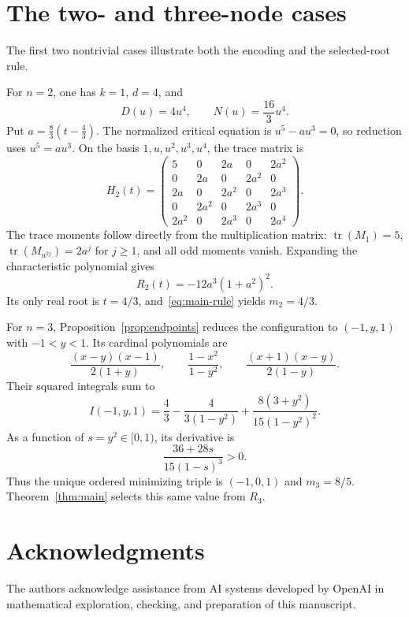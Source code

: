 \documentclass[11pt,leqno]{amsart}
\theoremstyle{definition}
\theoremstyle{remark}
\numberwithin{equation}{section}
\newcommand{\tr}{\operatorname{tr}}
\begin{document}
\section{The two- and three-node cases}\label{sec:examples}

The first two nontrivial cases illustrate both the encoding and the
selected-root rule.

For $n=2$, one has $k=1$, $d=4$, and
\[
 D(u)=4u^4,\qquad N(u)=\frac{16}{3}u^4.
\]
Put $a=\frac83(t-\frac43)$. The normalized critical equation is
$u^5-au^3=0$, so reduction uses $u^5=au^3$. On the basis
$1,u,u^2,u^3,u^4$, the trace matrix is
\begin{equation}\label{eq:two-node-H}
 H_2(t)=
 \begin{pmatrix}
 5&0&2a&0&2a^2\\
 0&2a&0&2a^2&0\\
 2a&0&2a^2&0&2a^3\\
 0&2a^2&0&2a^3&0\\
 2a^2&0&2a^3&0&2a^4
 \end{pmatrix}.
\end{equation}
The trace moments follow directly from the multiplication matrix:
$\tr(M_1)=5$, $\tr(M_{u^{2j}})=2a^j$ for $j\geq1$, and all odd
moments vanish. Expanding the characteristic polynomial gives
\[
 R_2(t)=-12a^3(1+a^2)^2.
\]
Its only real root is $t=4/3$, and~\eqref{eq:main-rule} yields
$m_2=4/3$.

For $n=3$, Proposition~\ref{prop:endpoints} reduces the configuration
to $(-1,y,1)$ with $-1<y<1$. Its cardinal polynomials are
\[
 \frac{(x-y)(x-1)}{2(1+y)},\qquad
 \frac{1-x^2}{1-y^2},\qquad
 \frac{(x+1)(x-y)}{2(1-y)}.
\]
Their squared integrals sum to
\begin{equation}\label{eq:three-node}
 I(-1,y,1)=\frac43-\frac{4}{3(1-y^2)}
                   +\frac{8(3+y^2)}{15(1-y^2)^2}.
\end{equation}
As a function of $s=y^2\in[0,1)$, its derivative is
\[
 \frac{36+28s}{15(1-s)^3}>0.
\]
Thus the unique ordered minimizing triple is $(-1,0,1)$ and
$m_3=8/5$. Theorem~\ref{thm:main} selects this same value from $R_3$.

\section*{Acknowledgments}
The authors acknowledge assistance from AI systems developed by OpenAI
in mathematical exploration, checking, and preparation of this manuscript.
\end{document}
